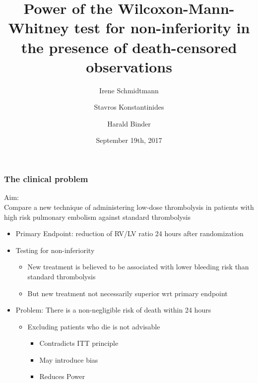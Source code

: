 \documentclass[xcolor=pdftex,dvipsnames,table]{beamer}\usepackage[]{graphicx}\usepackage[]{color}
\title{Power of the Wilcoxon-Mann-Whitney test for non-inferiority in the presence 
of death-censored observations} %
\author{Irene Schmidtmann\inst{1} \and 
Stavros Konstantinides\inst{2} \and 
Harald Binder\inst{3}}
\institute[University Medical Center Johannes-Gutenberg-University Mainz] %
{
  \inst{1}%
  Institute for Medical Biostatistics, Epidemiology and Informatics (IMBEI)
  \and
  \inst{2}%
  Center for Thrombosis and Hemostasis Mainz (CTH)\\
University Medical Center Johannes-Gutenberg-University Mainz
\and
\inst{3}%
Institute for Medical Biometry and Statistics  \\
University of Freiburg}
\date{September 19th, 2017}
\begin{document}



\begin{frame}[plain] %
\titlepage
\end{frame}

\begin{frame}[label = slide2] %
\frametitle{The clinical problem}
Aim:\\
Compare a new technique of administering low-dose thrombolysis in patients with high risk pulmonary embolism against standard thrombolysis
\begin{itemize}
	\item Primary Endpoint: reduction of RV/LV ratio 24 hours after randomization
	\item Testing for non-inferiority 
	\begin{itemize}
		\item New treatment is believed to be associated with lower bleeding risk than standard thrombolysis
		\item But new treatment not necessarily superior wrt primary endpoint
	\end{itemize}
	\item Problem: There is a non-negligible risk of death within 24 hours
	\begin{itemize}
		\item Excluding patients who die is not advisable
		\begin{itemize}
			\item Contradicts ITT principle
			\item May introduce bias
			\item Reduces Power
		\end{itemize}
	\end{itemize}
\end{itemize}
\end{frame}
\end{document}
